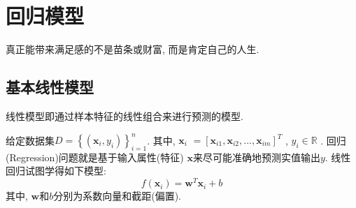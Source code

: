 \chapter{回归模型}
\vspace{0.5in}
	\begin{center}
	    \textcolor[RGB]{255, 0, 0}{\faHeart}真正能带来满足感的不是苗条或财富, 而是肯定自己的人生.\textcolor[RGB]{255, 0, 0}{\faHeart}
	\end{center}
\begin{center}
\end{center}
\section{基本线性模型}
线性模型即通过样本特征的线性组合来进行预测的模型. 

给定数据集$D=\left\{ \left( \boldsymbol{x}_i,y_i \right) \right\} _{i=1}^{n}$. 其中, $\boldsymbol{x}_i$ $=\left[ \boldsymbol{x}_{i1},\boldsymbol{x}_{i2},...,\boldsymbol{x}_{im} \right] ^T$ , $y_i\in \mathbb{R}$ . 回归(Regression)问题就是基于输入属性(特征) $\boldsymbol{x}$来尽可能准确地预测实值输出$y$. 线性回归试图学得如下模型:
\begin{equation}
f\left( \boldsymbol{x}_i \right) =\boldsymbol{w}^T\boldsymbol{x}_i+b
\end{equation}
其中, $\boldsymbol{w}$和$b$分别为系数向量和截距(偏置). 

